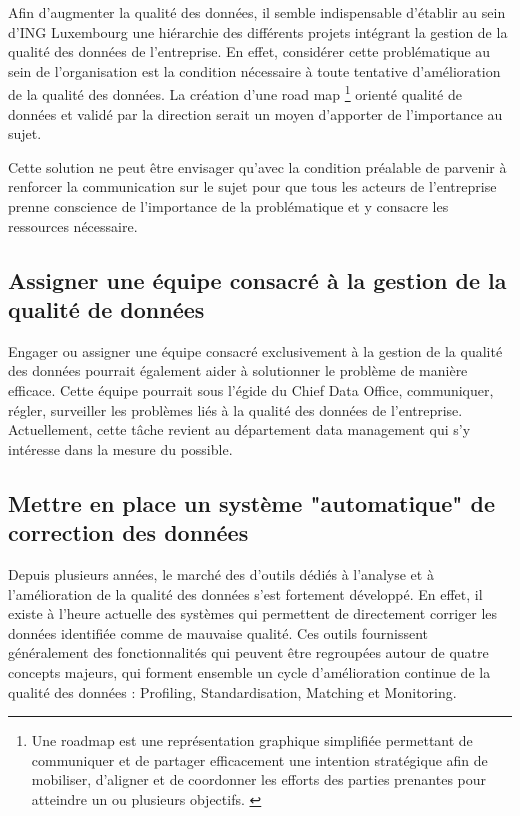 \documentclass[a4paper, 12pt, french]{article}
\begin{document}
Afin d'augmenter la qualité des données, il semble indispensable d’établir au sein d’ING Luxembourg une hiérarchie des différents projets intégrant la gestion de la qualité des données de l’entreprise. En effet, considérer cette problématique au sein de l’organisation est la condition nécessaire à toute tentative d’amélioration de la qualité des données. La création d’une road map \footnote{Une roadmap est une représentation graphique simplifiée permettant de communiquer et de partager efficacement une intention stratégique afin de mobiliser, d’aligner et de coordonner les efforts des parties prenantes pour atteindre un ou plusieurs objectifs. \citep{WikipediaRoadmap}} orienté qualité de données et validé par la direction serait un moyen d’apporter de l’importance au sujet. 

Cette solution ne peut être envisager qu’avec la condition préalable de parvenir à renforcer la communication sur le sujet pour que tous les acteurs de l’entreprise prenne conscience de l’importance de la problématique et y consacre les ressources nécessaire. 

\subsection{Assigner une équipe consacré à la gestion de la qualité de données}

Engager ou assigner une équipe consacré exclusivement à la gestion de la qualité des données pourrait également aider à solutionner le problème de manière efficace. Cette équipe pourrait sous l’égide du Chief Data Office, communiquer, régler, surveiller les problèmes liés à la qualité des données de l’entreprise. Actuellement, cette tâche revient au département data management qui s’y intéresse dans la mesure du possible. 

\subsection{Mettre en place un système "automatique" de correction des données}

Depuis plusieurs années, le marché des d’outils dédiés à l’analyse et à l’amélioration de la qualité des données s’est fortement développé. En effet, il existe à l’heure actuelle des systèmes qui permettent de directement corriger les données identifiée comme de mauvaise qualité. Ces outils fournissent généralement des fonctionnalités qui peuvent être regroupées autour de quatre concepts
majeurs, qui forment ensemble un cycle d’amélioration continue de la qualité des données : Profiling, Standardisation, Matching et Monitoring. \\
\end{document}

